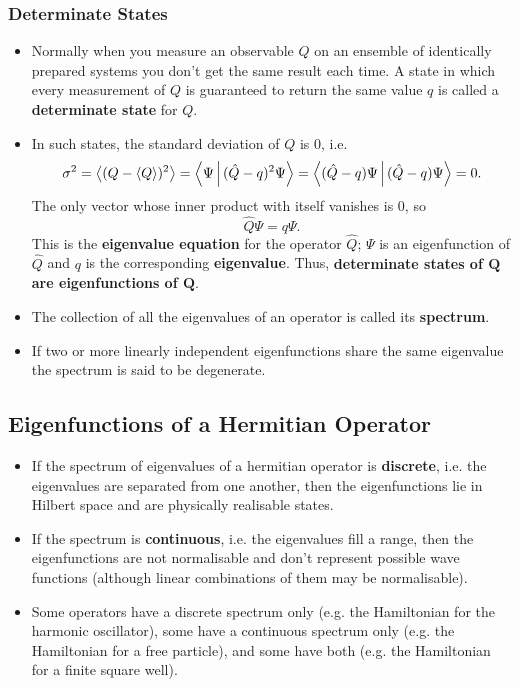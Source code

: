 \documentclass{article}
\begin{document}
\subsubsection{Determinate States}

\begin{itemize}
  \item Normally when you measure an observable $Q$ on an ensemble of identically prepared systems you don't get the same result each time. A state in which every measurement of $Q$ is guaranteed to return the same value $q$ is called a \textbf{determinate state} for $Q$.

  \item In such states, the standard deviation of $Q$ is $0$, i.e. \[\sigma^2 = \Braket{(Q - \braket{Q})^2} = \Braket{\Psi | (\hat{Q} - q)^2 \Psi} = \Braket{(\hat{Q} - q) \Psi | (\hat{Q} - q) \Psi} = 0.\] The only vector whose inner product with itself vanishes is $0$, so \[\hat{Q} \Psi = q \Psi.\] This is the \textbf{eigenvalue equation} for the operator $\hat{Q}$; $\Psi$ is an eigenfunction of $\hat{Q}$ and $q$ is the corresponding \textbf{eigenvalue}. Thus, \textbf{determinate states of $\boldsymbol{Q}$ are eigenfunctions of $\boldsymbol{\hat{Q}}$}.

  \item The collection of all the eigenvalues of an operator is called its \textbf{spectrum}.

  \item If two or more linearly independent eigenfunctions share the same eigenvalue the spectrum is said to be degenerate.
\end{itemize}

\subsection{Eigenfunctions of a Hermitian Operator}

\begin{itemize}
  \item If the spectrum of eigenvalues of a hermitian operator is \textbf{discrete}, i.e. the eigenvalues are separated from one another, then the eigenfunctions lie in Hilbert space and are physically realisable states.

  \item If the spectrum is \textbf{continuous}, i.e. the eigenvalues fill a range, then the eigenfunctions are not normalisable and don't represent possible wave functions (although linear combinations of them may be normalisable).

  \item Some operators have a discrete spectrum only (e.g. the Hamiltonian for the harmonic oscillator), some have a continuous spectrum only (e.g. the Hamiltonian for a free particle), and some have both (e.g. the Hamiltonian for a finite square well).
\end{itemize}
\end{document}

